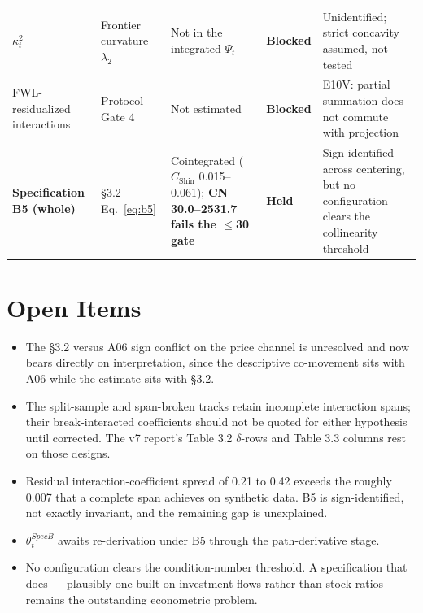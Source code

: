 \documentclass[11pt,a4paper]{article}
\begin{document}
\begin{landscape}
\begin{table}[H]
\begin{tabular}{p{3.6cm}p{4.4cm}p{6.4cm}p{2.2cm}p{6.0cm}}
$\kappa^2_t$ & Frontier curvature $\lambda_2$ & Not in the integrated $\Psi_t$ & \textbf{Blocked} & Unidentified; strict concavity assumed, not tested \\
FWL-residualized interactions & Protocol Gate 4 & Not estimated & \textbf{Blocked} & E10V: partial summation does not commute with projection \\
\midrule
\textbf{Specification B5 (whole)} & \S3.2 Eq.~\ref{eq:b5} & Cointegrated ($C_{\text{Shin}}$ 0.015--0.061); \textbf{CN 30.0--2531.7 fails the $\le$30 gate} & \textbf{Held} & Sign-identified across centering, but no configuration clears the collinearity threshold \\
\bottomrule
\end{tabular}
\end{table}
\end{landscape}

\FloatBarrier
\section{Open Items}

\begin{itemize}
\item The \S3.2 versus A06 sign conflict on the price channel is unresolved and now bears directly on interpretation, since the descriptive co-movement sits with A06 while the estimate sits with \S3.2.
\item The split-sample and span-broken tracks retain incomplete interaction spans; their break-interacted coefficients should not be quoted for either hypothesis until corrected. The v7 report's Table 3.2 $\delta$-rows and Table 3.3 columns rest on those designs.
\item Residual interaction-coefficient spread of 0.21 to 0.42 exceeds the roughly 0.007 that a complete span achieves on synthetic data. B5 is sign-identified, not exactly invariant, and the remaining gap is unexplained.
\item $\theta^{SpecB}_t$ awaits re-derivation under B5 through the path-derivative stage.
\item No configuration clears the condition-number threshold. A specification that does --- plausibly one built on investment flows rather than stock ratios --- remains the outstanding econometric problem.
\end{itemize}
\end{document}
